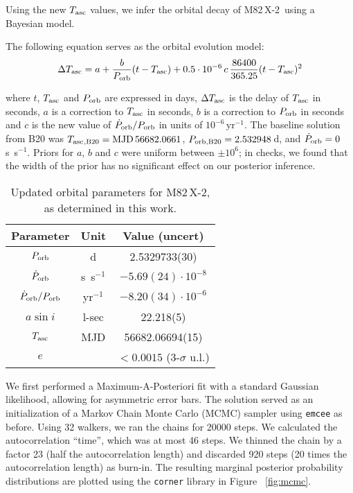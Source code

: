 \documentclass[twocolumn]{aastex631}
\newcommand{\Mtwo}{M82\,X-2\xspace}
\newcommand{\Porbdot}{\ensuremath{\dot{P}_{\rm orb}}}
\newcommand{\Porb}{\ensuremath{P_{\rm orb}}}
\newcommand{\tasc}{\ensuremath{T_{\rm asc}{}}}
\newcommand{\msix}{\ensuremath{10^{-6}}\xspace}
\newcommand{\yrmone}{\ensuremath{\mathrm{yr^{-1}}}\xspace}
\newcommand{\msixyrmone}{\ensuremath{\msix\,\yrmone}\xspace}
\begin{document}
Using the new $T_{\rm asc}$ values, we infer the orbital decay of \Mtwo\ using a Bayesian model.

The following equation serves as the orbital evolution model:
\begin{equation}\label{eq:map}
    \Delta \tasc = a +  \frac{b}{\Porb} (t - \tasc) + 0.5\cdot\msix\,c\, \frac{86400}{365.25} (t - \tasc)^2
\end{equation}

where $t$, $\tasc$ and $\Porb$ are expressed in days, $\Delta \tasc$ is the delay of $\tasc$ in seconds, $a$ is a correction to $\tasc$ in seconds, $b$ is a correction to $\Porb$ in seconds and $c$ is the new value of $\Porbdot/\Porb$ in units of $\msixyrmone$.
The baseline solution from B20 was $\tasc_{,\rm B20}=\mathrm{MJD}\,56682.0661$, $P_{\rm orb,B20}=2.532948$\,d, and $\Porbdot=0$\,s~s$^{-1}$.
Priors for $a$, $b$ and $c$ were uniform between $\pm10^6$; in checks, we found that the width of the prior has no significant effect on our posterior inference.

\begin{table}[ht]
    \centering
        \begin{tabular}{ccc}
         \hline
        Parameter & Unit & Value (uncert)  \\
        \hline
        $\Porb$ & d & 2.5329733(30) \\
        $\Porbdot$ & s~s$^{-1}$ & $-5.69(24) \cdot 10^{-8}$ \\
        $\Porbdot/\Porb$ & yr$^{-1}$ & $-8.20(34)\cdot \msix$ \\
        $a \sin i$ & l-sec & 22.218(5) \\
        $\tasc$ & MJD & 56682.06694(15)\\
        $e$ & & $<0.0015$ (3-$\sigma$ u.l.)\\
        \hline
        \end{tabular}
    \caption{Updated orbital parameters for \Mtwo, as determined in this work.}
    \label{tab:eph}
\end{table}

We first performed a Maximum-A-Posteriori fit with a standard Gaussian likelihood, allowing for asymmetric error bars. The solution served as an initialization of a Markov Chain Monte Carlo (MCMC) sampler using \texttt{emcee} as before. Using 32 walkers, we ran the chains for 20000 steps.
We calculated the autocorrelation ``time'', which was at most 46 steps. We thinned the chain by a factor 23 (half the autocorrelation length) and discarded 920 steps (20 times the autocorrelation length) as burn-in.
The resulting marginal posterior probability distributions are plotted using the \texttt{corner} library \citep{corner} in Figure ~\ref{fig:mcmc}.
\end{document}
